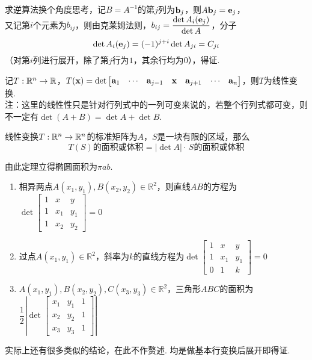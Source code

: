 \begin{analysis}求逆算法换个角度思考，记$B=A^{-1}$的第$j$列为$\mathbf{b}_j$，则$A\mathbf{b}_j=\mathbf{e}_j$，\\
又记第$i$个元素为$b_{ij}$，则由克莱姆法则，$b_{ij}=\dfrac{\det A_i(\mathbf{e}_j)}{\det A}$，分子
\[\det A_i(\mathbf{e}_j)=(-1)^{j+i}\det A_{ji}=C_{ji}\]
（对第$i$列进行展开，除了第$j$行为$1$，其余行均为$0$），得证.
\end{analysis}
\begin{theorem}[行列式的线性性]
记$T:\mathbb{R}^n\to\mathbb{R}$，$T(\mathbf{x})=\det\begin{bmatrix}\mathbf{a}_1&\cdots&\mathbf{a}_{j-1}&\mathbf{x}&\mathbf{a}_{j+1}&\cdots&\mathbf{a}_n\end{bmatrix}$，则$T$为线性变换.\\
注：这里的线性性只是针对行列式中的一列可变来说的，若整个行列式都可变，则不一定有$\det (A+B)=\det A+\det B$.
\end{theorem}
\begin{theorem}[线性变换与体积变化]
线性变换$T:\mathbb{R}^n\to\mathbb{R}^n$的标准矩阵为$A$，$S$是一块有限的区域，那么
\[T(S)\text{的面积或体积}=|\det A|\cdot\,S\text{的面积或体积}\]
\end{theorem}
由此定理立得椭圆面积为$\pi a b$.
\begin{theorem}[解析几何]
\begin{enumerate}
	\item 相异两点$A(x_1,y_1),B(x_2,y_2)\in\mathbb{R}^2$，则直线$AB$的方程为$\det\begin{bmatrix}1&x&y\\1&x_1&y_1\\1&x_2&y_2\end{bmatrix}=0$
	\item 过点$A(x_1,y_1)\in\mathbb{R}^2$，斜率为$k$的直线方程为$\det\begin{bmatrix}1&x&y\\1&x_1&y_1\\0&1&k\end{bmatrix}=0$
	\item $A(x_1,y_1),B(x_2,y_2),C(x_3,y_3)\in\mathbb{R}^2$，三角形$ABC$的面积为$\dfrac{1}{2}\left|\det\begin{bmatrix}x_1&y_1&1\\x_2&y_2&1\\x_3&y_3&1\end{bmatrix}\right|$
\end{enumerate}
\end{theorem}
\begin{analysis}
实际上还有很多类似的结论，在此不作赘述. 均是做基本行变换后展开即得证.
\end{analysis}
